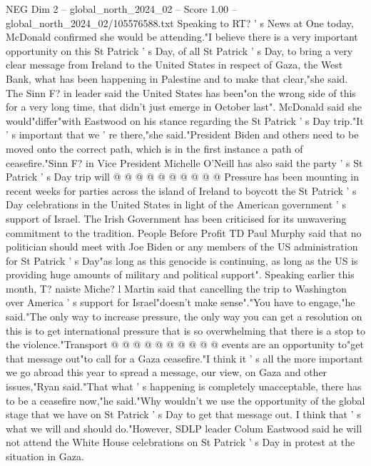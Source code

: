 \begin{textsample}{NEG Dim 2 – global\_north\_2024\_02 – Score 1.00 – global\_north\_2024\_02/105576588.txt}  \label{ex:f2_neg_176}
Speaking to RT? ' s News at One today, McDonald confirmed she would be attending."I believe there is a very important opportunity on this St Patrick ' s Day, of all St Patrick ' s Day, to bring a very clear message from Ireland to the United States in respect of Gaza, the West Bank, what has been happening in Palestine and to make that clear,"she said.
The Sinn F? in leader said the United States has been"on the wrong side of this for a very long time, that didn't just emerge in October last".
McDonald said she would"differ"with Eastwood on his stance regarding the St Patrick ' s Day trip."It ' s important that we ' re there,"she said."President Biden and others need to be moved onto the correct path, which is in the first instance a path of ceasefire."Sinn F? in Vice President Michelle O'Neill has also said the party ' s St Patrick ' s Day trip will @ @ @ @ @ @ @ @ @ @ Pressure has been mounting in recent weeks for parties across the island of Ireland to boycott the St Patrick ' s Day celebrations in the United States in light of the American government ' s support of Israel.
The Irish Government has been criticised for its unwavering commitment to the tradition.
People Before Profit TD Paul Murphy said that no politician should meet with Joe Biden or any members of the US administration for St Patrick ' s Day"as long as this genocide is continuing, as long as the US is providing huge amounts of military and political support".
Speaking earlier this month, T? naiste Miche? l Martin said that cancelling the trip to Washington over America ' s support for Israel"doesn't make sense"."You have to engage,"he said."The only way to increase pressure, the only way you can get a resolution on this is to get international pressure that is so overwhelming that there is a stop to the violence."Transport @ @ @ @ @ @ @ @ @ @ events are an opportunity to"get that message out"to call for a Gaza ceasefire."I think it ' s all the more important we go abroad this year to spread a message, our view, on Gaza and other issues,"Ryan said."That what ' s happening is completely unacceptable, there has to be a ceasefire now,"he said."Why wouldn't we use the opportunity of the global stage that we have on St Patrick ' s Day to get that message out.
I think that ' s what we will and should do."However, SDLP leader Colum Eastwood said he will not attend the White House celebrations on St Patrick ' s Day in protest at the situation in Gaza.

\end{textsample}
